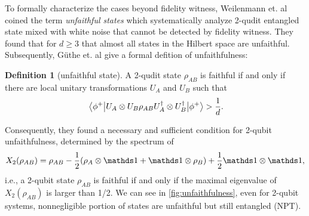 \documentclass[
reprint,
aps,
pra,
floatfix,
]{revtex4-2}
\theoremstyle{plain}
\theoremstyle{definition}
\newtheorem{definition}{Definition}
\newcommand{\dm}{\rho}
\newcommand{\U}{U}
\begin{document}
To formally characterize the cases beyond fidelity witness, Weilenmann et. al \cite{weilenmannEntanglementDetectionMeasuring2020} coined the term \emph{unfaithful states} 
which systematically analyze 2-qudit entangled state mixed with white noise that cannot be detected by fidelity witness.
They found that for $d \ge 3$ that almost all states in the Hilbert space are unfaithful. 
Subsequently, G\"{u}the et. al \cite{guhneGeometryFaithfulEntanglement2021} \cite{riccardiExploringRelationshipFaithfulness2021} give a formal defition of unfaithfulness: 
\begin{definition}[unfaithful state]\label{def:unfaithful_state}
	A 2-qudit state $\dm_{AB}$ is faithful if and only if there are local unitary transformations $\U_A$ and $\U_B$ such that
	\begin{equation}
		\expval{\U_A\otimes\U_B \dm_{AB} \U_A^\dagger \otimes\U_B^\dagger}{\phi^+}
		> \frac{1}{d}.
	\end{equation}
\end{definition}
Consequently, they found a necessary and sufficient condition for 2-qubit unfaithfulness, determined by the spectrum of
\begin{equation}
	X_2( \dm_{AB})=\rho_{AB}-\frac{1}{2}(\dm_{A}\otimes \identity + \identity \otimes \dm_{B})+\frac{1}{2} \identity \otimes \identity
	\label{eq:unfaithful_2qubit},
\end{equation}
i.e.,
a 2-qubit state $\dm_{AB}$ is faithful if and only if the maximal eigenvalue of $X_2( \dm_{AB})$ is larger than 1/2.
We can see in \cref{fig:unfaithfulness}, even for 2-qubit systems, nonnegligible portion of states are unfaithful but still entangled (NPT).
\end{document}
